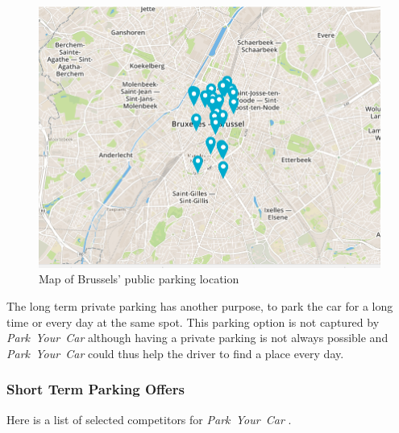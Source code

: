 \documentclass[12pt,a4paper,oneside]{book}
\newcommand{\bp}{\textit{Park~Your~Car }}
\begin{document}
\begin{figure}[h]
\centering
\caption{Map of Brussels' public parking location\cite{pubparkmap}}
\label{pubparcmap}
\includegraphics[keepaspectratio=true,width=\textwidth-2cm]{images/publicpark.png}
\end{figure}

The long term private parking has another purpose, to park the car for a long time or every day at the same spot. This parking option is not captured by \bp although having a private parking is not always possible and \bp could thus help the driver to find a place every day.

\subsubsection{Short Term Parking Offers}

Here is a list of selected competitors for \bp .
\end{document}
